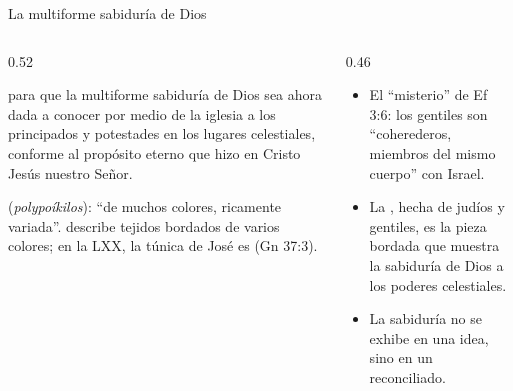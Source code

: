\begin{frame}{La multiforme sabiduría de Dios}
\begin{columns}[t,onlytextwidth]
\begin{column}{0.52\textwidth}
\begin{cita}para que la multiforme sabiduría de Dios sea ahora dada a conocer por medio de la iglesia a los principados y potestades en los lugares celestiales, conforme al propósito eterno que hizo en Cristo Jesús nuestro Señor.\end{cita}
\begin{center}\end{center}
\scriptsize {} (\emph{polypoíkilos}): ``de muchos colores, ricamente variada''.  describe tejidos bordados de varios colores; en la LXX, la túnica de José es  (Gn 37:3).
\end{column}
\begin{column}{0.46\textwidth}\small
\begin{itemize}
\item El ``misterio'' de Ef 3:6: los gentiles son ``coherederos, miembros del mismo cuerpo'' con Israel.
\item La , hecha de judíos y gentiles, es la pieza bordada que muestra la sabiduría de Dios a los poderes celestiales.
\item La sabiduría no se exhibe en una idea, sino en un  reconciliado.
\end{itemize}
\end{column}
\end{columns}
\end{frame}

